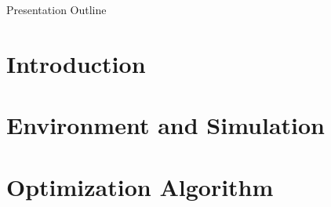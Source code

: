 \documentclass[11pt]{beamer}
\begin{document}
\frame{\titlepage}

\begin{frame}{Presentation Outline}
\begin{tiny}
    \vspace*{-1em}
    \tableofcontents[hideallsubsections]
\end{tiny}
\end{frame}

\AtBeginSection[]
{
\begin{frame}{}
    \tableofcontents[sections={\thesection}]
\end{frame}
}


\section{Introduction}






\section{Environment and Simulation}






\section{Optimization Algorithm}






\end{document}
